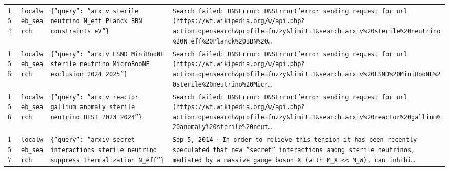 \documentclass[11pt,a4paper]{article}
\begin{document}
\begin{longtable}{@{}p{}p{}p{}p{}@{}}
154 & \texttt{local}\newline\texttt{web\_\allowbreak{}search} & \texttt{\{''query'':\allowbreak{} ''arxiv sterile neutrino N\_\allowbreak{}eff Planck BBN constraints eV''\}\allowbreak{}} & \texttt{Search failed:\allowbreak{} DNSError:\allowbreak{} DNSError('error sending request for url (https:\allowbreak{}/\allowbreak{}/\allowbreak{}wt.wikipedia.org/\allowbreak{}w/\allowbreak{}api.php?action=\allowbreak{}opensearch\&profile=\allowbreak{}fuzzy\&limit=\allowbreak{}1\&search=\allowbreak{}arxiv\%20sterile\%20neutrino\%20N\_\allowbreak{}eff\%20Planck\%20BBN\%20\ldots{}\allowbreak{}} \\
155 & \texttt{local}\newline\texttt{web\_\allowbreak{}search} & \texttt{\{''query'':\allowbreak{} ''arxiv LSND MiniBooNE sterile neutrino MicroBooNE exclusion 2024 2025''\}\allowbreak{}} & \texttt{Search failed:\allowbreak{} DNSError:\allowbreak{} DNSError('error sending request for url (https:\allowbreak{}/\allowbreak{}/\allowbreak{}wt.wikipedia.org/\allowbreak{}w/\allowbreak{}api.php?action=\allowbreak{}opensearch\&profile=\allowbreak{}fuzzy\&limit=\allowbreak{}1\&search=\allowbreak{}arxiv\%20LSND\%20MiniBooNE\%20sterile\%20neutrino\%20Micr\ldots{}\allowbreak{}} \\
156 & \texttt{local}\newline\texttt{web\_\allowbreak{}search} & \texttt{\{''query'':\allowbreak{} ''arxiv reactor gallium anomaly sterile neutrino BEST 2023 2024''\}\allowbreak{}} & \texttt{Search failed:\allowbreak{} DNSError:\allowbreak{} DNSError('error sending request for url (https:\allowbreak{}/\allowbreak{}/\allowbreak{}wt.wikipedia.org/\allowbreak{}w/\allowbreak{}api.php?action=\allowbreak{}opensearch\&profile=\allowbreak{}fuzzy\&limit=\allowbreak{}1\&search=\allowbreak{}arxiv\%20reactor\%20gallium\%20anomaly\%20sterile\%20neut\ldots{}\allowbreak{}} \\
157 & \texttt{local}\newline\texttt{web\_\allowbreak{}search} & \texttt{\{''query'':\allowbreak{} ''arxiv secret interactions sterile neutrino suppress thermalization N\_\allowbreak{}eff''\}\allowbreak{}} & \texttt{Sep 5,\allowbreak{} 2014 $\cdot$ In order to relieve this tension it has been recently speculated that new ''secret'' interactions among sterile neutrinos,\allowbreak{} mediated by a massive gauge boson X (with M\_\allowbreak{}X \textless{}\allowbreak{}\textless{}\allowbreak{} M\_\allowbreak{}W)\allowbreak{},\allowbreak{} can inhibi\ldots{}\allowbreak{}} \\

\end{longtable}
\end{document}
